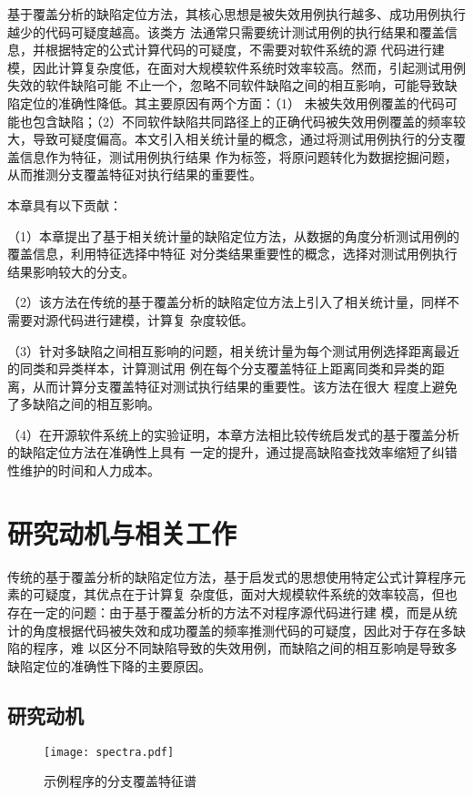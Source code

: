 基于覆盖分析的缺陷定位方法，其核心思想是被失效用例执行越多、成功用例执行越少的代码可疑度越高。该类方
法通常只需要统计测试用例的执行结果和覆盖信息，并根据特定的公式计算代码的可疑度，不需要对软件系统的源
代码进行建模，因此计算复杂度低，在面对大规模软件系统时效率较高。然而，引起测试用例失效的软件缺陷可能
不止一个，忽略不同软件缺陷之间的相互影响，可能导致缺陷定位的准确性降低。其主要原因有两个方面：（1）
未被失效用例覆盖的代码可能也包含缺陷；（2）不同软件缺陷共同路径上的正确代码被失效用例覆盖的频率较
大，导致可疑度偏高。本文引入相关统计量的概念，通过将测试用例执行的分支覆盖信息作为特征，测试用例执行结果
作为标签，将原问题转化为数据挖掘问题，从而推测分支覆盖特征对执行结果的重要性。

本章具有以下贡献：

（1）本章提出了基于相关统计量的缺陷定位方法，从数据的角度分析测试用例的覆盖信息，利用特征选择中特征
对分类结果重要性的概念，选择对测试用例执行结果影响较大的分支。

（2）该方法在传统的基于覆盖分析的缺陷定位方法上引入了相关统计量，同样不需要对源代码进行建模，计算复
杂度较低。

（3）针对多缺陷之间相互影响的问题，相关统计量为每个测试用例选择距离最近的同类和异类样本，计算测试用
例在每个分支覆盖特征上距离同类和异类的距离，从而计算分支覆盖特征对测试执行结果的重要性。该方法在很大
程度上避免了多缺陷之间的相互影响。

（4）在开源软件系统上的实验证明，本章方法相比较传统启发式的基于覆盖分析的缺陷定位方法在准确性上具有
一定的提升，通过提高缺陷查找效率缩短了纠错性维护的时间和人力成本。


\section{研究动机与相关工作}\label{motivation1}
传统的基于覆盖分析的缺陷定位方法，基于启发式的思想使用特定公式计算程序元素的可疑度，其优点在于计算复
杂度低，面对大规模软件系统的效率较高，但也存在一定的问题：由于基于覆盖分析的方法不对程序源代码进行建
模，而是从统计的角度根据代码被失效和成功覆盖的频率推测代码的可疑度，因此对于存在多缺陷的程序，难
以区分不同缺陷导致的失效用例，而缺陷之间的相互影响是导致多缺陷定位的准确性下降的主要原因。

\subsection{研究动机}
\begin{figure}[htp]
      \centering
      \texttt{[image: spectra.pdf]}
      \caption{示例程序的分支覆盖特征谱}
      \label{fig:spectra}
\end{figure}

